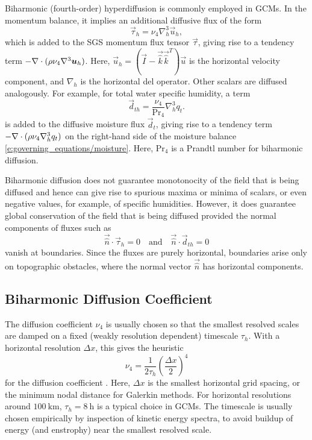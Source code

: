 \documentclass{report}
\begin{document}
Biharmonic (fourth-order) hyperdiffusion is commonly employed in GCMs. In the momentum balance, it implies an additional diffusive flux of the form
\begin{equation}
\vec{\tau}_h = \nu_4 \nabla_h^3 \vec{u}_h,
\end{equation}
which is added to the SGS momentum flux tensor $\vec{\tau}$, giving rise to a tendency term $-\nabla \cdot (\rho \nu_4 \nabla^3 \boldsymbol{{u}}_h)$. Here, $\vec{u}_h = (\vec{I} - \vec{\hat k} \vec{\hat k}^T) \vec{u}$ is the horizontal velocity component, and $\nabla_h$ is the horizontal del operator. Other scalars are diffused analogously. For example, for total water specific humidity, a term 
\begin{equation}
    \vec{d}_{th} = \frac{\nu_4}{\mathrm{Pr}_4} \nabla_h^3 q_t.
\end{equation}
is added to the diffusive moisture flux $\vec{d}_t$, giving rise to a tendency term $-\nabla \cdot (\rho \nu_4 \nabla_h^3 q_t)$ on the right-hand side of the moisture balance \eqref{e:governing_equations/moisture}. Here, $\mathrm{Pr}_4$ is a Prandtl number for biharmonic diffusion.

Biharmonic diffusion does not guarantee monotonocity of the field that is being diffused and hence can give rise to spurious maxima or minima of scalars, or even negative values, for example, of specific humidities. However, it does guarantee global conservation of the field that is being diffused provided the normal components of fluxes such as 
\[
\vec{\hat n} \cdot \vec{\tau}_h =0 \quad \text{and} \quad \vec{\hat n} \cdot \vec{d}_{th} = 0
\]
vanish at boundaries. Since the fluxes are purely horizontal, boundaries arise only on topographic obstacles, where the normal vector $\vec{\hat n}$ has horizontal components.

\subsection{Biharmonic Diffusion Coefficient}

The diffusion coefficient $\nu_4$ is usually chosen so that the smallest resolved scales are damped on a fixed (weakly resolution dependent) timescale $\tau_h$. With a horizontal resolution $\Delta x$, this gives the heuristic 
\begin{equation}
    \nu_4 = \frac{1}{2\tau_h} \left(\frac{\Delta x}{2}\right)^4
\end{equation}
for the diffusion coefficient \citep{Jablonowski11a}. Here, $\Delta x$ is the smallest horizontal grid spacing, or the minimum nodal distance for Galerkin methods. For horizontal resolutions around $100~\mathrm{km}$, $\tau_h = 8~\mathrm{h}$ is a typical choice in GCMs. The timescale is usually chosen empirically by inspection of kinetic energy spectra, to avoid buildup of energy (and enstrophy) near the smallest resolved scale.
\end{document}
